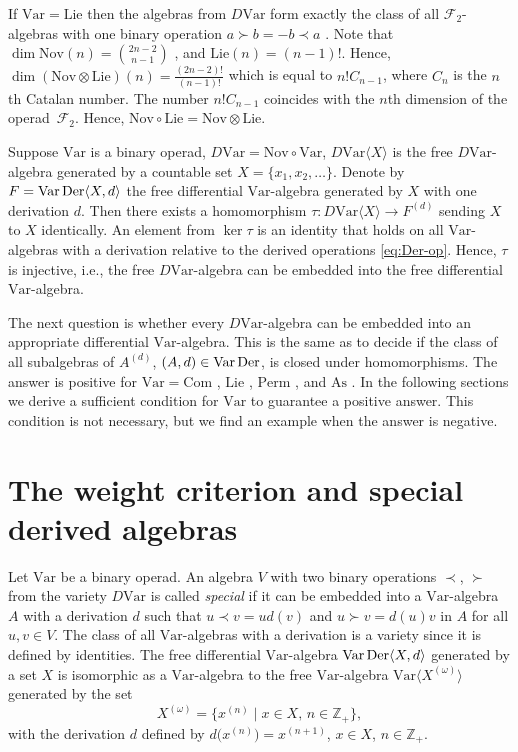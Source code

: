 \documentclass[pdftex]{sigma}
\numberwithin{equation}{section}
\def\Var{\mathrm{Var}}
\def\Nov{\mathrm{Nov}}
\def\Com{\mathrm{Com}}
\def\As{\mathrm{As}}
\def\Lie{\mathrm{Lie}}
\def\Perm{\mathrm{Perm}}
\def\Der {\mathop {\fam 0 Der}\nolimits}
\begin{document}
If $\Var = \Lie $ then the algebras from $D\Var $ form exactly the class of
all $\mathcal F_2$-algebras with one binary operation $a\succ b = -b\prec a$ \cite{KSO2019}.
Note that $\dim \Nov(n) = \binom{2n-2}{n-1}$ \cite{Dzhumad-codimgrowth}, and $\Lie(n)=(n-1)!$.
Hence,
$\dim (\Nov\otimes \Lie)(n) = \frac{(2n-2)!}{(n-1)!}$ which is equal
to $n!C_{n-1}$, where $C_n$ is the $n$th Catalan number.
The number $n!C_{n-1}$ coincides with the $n$th dimension
of the operad~$\mathcal F_2$.
Hence,
$\Nov\circ \Lie = \Nov \otimes \Lie $.

Suppose $\Var $ is a binary operad, $D\Var = \Nov\circ \Var$,
$D\Var\langle X\rangle $ is the free $D\Var$-algebra generated by a countable set
$X=\{x_1,x_2,\dots \}$. Denote by $F=\Var\Der\langle X,d\rangle $ the
free differential $\Var $-algebra generated by $X$ with one derivation $d$.
Then there exists a homomorphism $\tau \colon D\Var\langle X\rangle \to F^{(d)}$
sending $X$ to $X$ identically.
An element from $\ker \tau $ is an identity that holds on all $\Var $-algebras
with a derivation relative to the derived operations \eqref{eq:Der-op}.
Hence, $\tau $ is injective, i.e., the free $D\Var$-algebra
can be embedded into the free differential $\Var $-algebra.

The next question is whether every $D\Var$-algebra can be embedded into an
appropriate differential $\Var $-algebra.
This is the same as to decide if the class of all subalgebras of $A^{(d)}$,
$(A,d)\in \Var\Der$, is closed under homomorphisms.
The answer is positive
for $\Var = \Com $ \cite{BCZ-2017}, $\Lie $ \cite{KSO2019}, $\Perm $ \cite{KS2022}, and $\As $ \cite{SK-2022}.
In the following sections we derive a sufficient condition
for $\Var $ to guarantee a positive answer. This condition is
not necessary, but we find an example when the answer is negative.


\section{The weight criterion and special derived algebras}

Let $\Var $ be a binary operad.
An algebra $V$ with two binary operations $\prec$, $\succ $ from the variety
$D\Var $ is called {\em special} if it can be embedded into
a $\Var $-algebra $A$ with a derivation $d$ such that
$u\prec v = ud(v)$ and $u\succ v = d(u)v$ in $A$ for all
$u,v\in V$.
The class of all $\Var $-algebras with a derivation is a variety
since it is defined by identities. The free differential $\Var $-algebra
$\Var\Der\langle X,d\rangle $
generated by a set $X$ is isomorphic as a $\Var$-algebra
to the free $\Var$-algebra $\Var\bigl\langle X^{(\omega )}\bigr\rangle $
generated by the set
\[
X^{(\omega )} = \bigl\{x^{(n)} \mid x\in X,\, n\in \mathbb Z_+ \bigr\},
\]
with the derivation $d$ defined by $d\bigl(x^{(n)}\bigr) = x^{(n+1)}$,
$x\in X$, $n\in \mathbb Z_+$.
\end{document}
